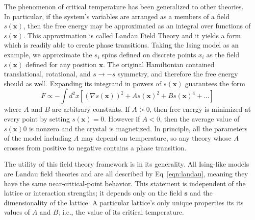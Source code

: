 \documentclass[
  amsmath,
  amssymb,
  aps,
  twocolumn,
  nofootinbib,
  nolongbibliography,
  floatfix,
]{revtex4-2}
\newcommand{\brackets}[1]{\left [ #1 \right ]}
\begin{document}
The phenomenon of critical temperature has been generalized to other theories. In particular, if the system's variables are arranged as a members of a field $s(\bm x)$, then the free energy may be approximated as an integral over functions of $s(\bm x)$. This approximation is called Landau Field Theory and it yields a form which is readily able to create phase transitions. Taking the Ising model as an example, we approximate the $s_i$ spins defined on discrete points $x_i$ as the field $s(\bm x)$ defined for any position $\bm x$. The original Hamiltonian contained translational, rotational, and $s\rightarrow-s$ symmetry, and therefore the free energy should as well. Expanding its integrand in powers of $s(\bm x)$ guarantees the form
\begin{equation}
F \propto -\int d^2 x \brackets{(\nabla s(\bm x))^2 + A s(\bm x)^2 + B s(\bm x)^4 + \dots}
\label{eqn:landau}
\end{equation}
where $A$ and $B$ are arbitrary constants. If $A>0$, then free energy is minimized at every point by setting $s(\bm x)=0$. However if $A<0$, then the average value of $s(\bm x)0$ is nonzero and the crystal is magnetized. In principle, all the parameters of the model including $A$ may depend on temperature, so any theory whose $A$ crosses from positive to negative contains a phase transition. 

The utility of this field theory framework is in its generality. All Ising-like models are Landau field theories and are all described by Eq~\ref{eqn:landau}, meaning they have the same near-critical-point behavior. This statement is independent of the lattice or interaction strengths; it depends only on the field $\bm s$ and the dimensionality of the lattice. A particular lattice's only unique properties its its values of $A$ and $B$; i.e., the value of its critical temperature.

\end{document}

